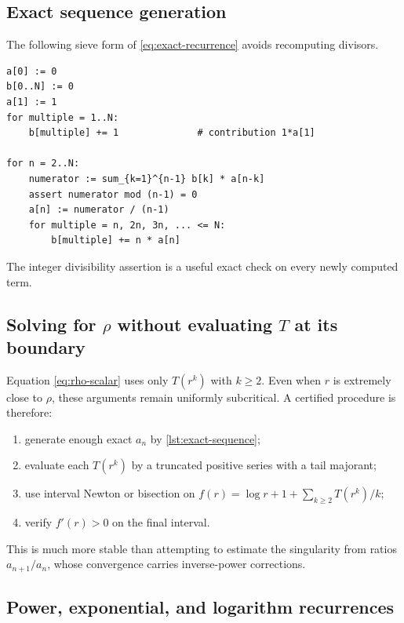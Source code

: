 \documentclass[11pt,oneside]{article}
\numberwithin{equation}{section}
\theoremstyle{plain}
\theoremstyle{definition}
\theoremstyle{remark}
\begin{document}
\subsection{Exact sequence generation}

The following sieve form of \eqref{eq:exact-recurrence} avoids recomputing
divisors.

\begin{lstlisting}[caption={Exact generation of $a_1,\ldots,a_N$ (language-neutral pseudocode).},label={lst:exact-sequence}]
a[0] := 0
b[0..N] := 0
a[1] := 1
for multiple = 1..N:
    b[multiple] += 1              # contribution 1*a[1]

for n = 2..N:
    numerator := sum_{k=1}^{n-1} b[k] * a[n-k]
    assert numerator mod (n-1) = 0
    a[n] := numerator / (n-1)
    for multiple = n, 2n, 3n, ... <= N:
        b[multiple] += n * a[n]
\end{lstlisting}
The integer divisibility assertion is a useful exact check on every newly
computed term.

\subsection{Solving for $\rho$ without evaluating $T$ at its boundary}

Equation \eqref{eq:rho-scalar} uses only $T(r^k)$ with $k\ge2$.  Even when
$r$ is extremely close to $\rho$, these arguments remain uniformly
subcritical.  A certified procedure is therefore:
\begin{enumerate}
\item generate enough exact $a_n$ by \cref{lst:exact-sequence};
\item evaluate each $T(r^k)$ by a truncated positive series with a tail
      majorant;
\item use interval Newton or bisection on
      $f(r)=\log r+1+\sum_{k\ge2}T(r^k)/k$;
\item verify $f'(r)>0$ on the final interval.
\end{enumerate}
This is much more stable than attempting to estimate the singularity from
ratios $a_{n+1}/a_n$, whose convergence carries inverse-power corrections.

\subsection{Power, exponential, and logarithm recurrences}
\end{document}
